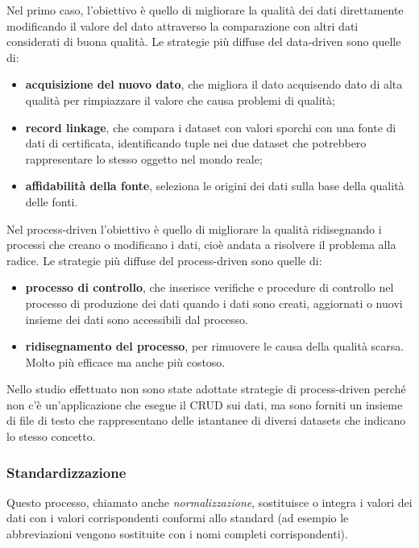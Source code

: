 \documentclass[a4paper,12pt]{article}
\begin{document}
\noindent Nel primo caso, l'obiettivo è quello di migliorare la qualità dei dati direttamente modificando il valore del dato attraverso la comparazione con altri dati considerati di buona qualità. Le strategie più diffuse del data-driven sono quelle di: 
\begin{itemize}
	\item \textbf{acquisizione del nuovo dato}, che migliora il dato acquisendo dato di alta qualità per rimpiazzare il valore che causa problemi di qualità;
	\item \textbf{record linkage}, che compara i dataset con valori sporchi con una fonte di dati di certificata, identificando tuple nei due dataset che potrebbero rappresentare lo stesso oggetto nel mondo reale;
	\item \textbf{affidabilità della fonte}, seleziona le origini dei dati sulla base della qualità delle fonti.
\end{itemize}
Nel process-driven l'obiettivo è quello di migliorare la qualità ridisegnando i processi che creano o modificano i dati, cioè andata a risolvere il problema alla radice. Le strategie più diffuse del process-driven sono quelle di: 
\begin{itemize}
	\item \textbf{processo di controllo}, che inserisce verifiche e procedure di controllo nel processo di produzione dei dati quando i dati sono creati, aggiornati o nuovi insieme dei dati sono accessibili dal processo.
	\item \textbf{ridisegnamento del processo}, per rimuovere le causa della qualità scarsa. Molto più efficace ma anche più costoso.
\end{itemize}

\noindent Nello studio effettuato non sono state adottate strategie di process-driven perché non c'è un'applicazione che esegue il CRUD sui dati, ma sono forniti un insieme di file di testo che rappresentano delle istantanee di diversi datasets che indicano lo stesso concetto.

\subsubsection{Standardizzazione}

Questo processo, chiamato anche \textit{normalizzazione}, sostituisce o integra i valori dei dati con i valori corrispondenti conformi allo standard (ad esempio le abbreviazioni vengono sostituite con i nomi completi corrispondenti).
\end{document}
